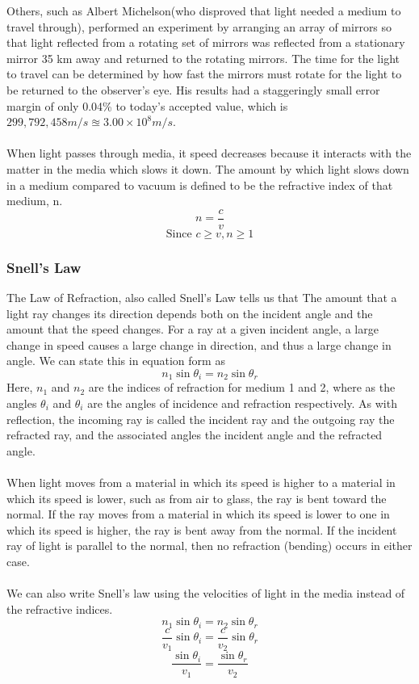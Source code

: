 \documentclass[11pt]{article}
\begin{document}
	Others, such as Albert Michelson(who disproved that light needed a medium to travel through), performed an experiment by arranging an array of mirrors so that light reflected from a rotating set of mirrors was reflected from a stationary mirror 35 km away and returned to the rotating mirrors. The time for the light to travel can be determined by how fast the mirrors must rotate for the light to be returned to the observer’s eye. His results had a staggeringly small error margin of only 0.04\% to today's accepted value, which is $299,792,458m/s\approxeq3.00\times10^8m/s$. \\ \\
	When light passes through media, it speed decreases because it interacts with the matter in the media which slows it down. The amount by which light slows down in a medium compared to vacuum is defined to be the refractive index of that medium, n.
	$$n=\dfrac{c}{v}$$
	$$\text{Since }c\ge v, n\ge1$$ 
	\subsubsection*{Snell's Law}
	The Law of Refraction, also called Snell's Law tells us that The amount that a light ray changes its direction depends both on the incident angle and the amount that the speed changes. For a ray at a given incident angle, a large change in speed causes a large change in direction, and thus a large change in angle. We can state this in equation form as
	$$n_{1} \sin \theta_{i} = n_{2} \sin \theta_{r}$$
	Here, $n_1$ and  $n_2$ are the indices of refraction for medium 1 and 2, where as the angles $\theta_i$ and $\theta_i$ are the angles of incidence and refraction respectively. As with reflection, the incoming ray is called the incident ray and the outgoing ray the refracted ray, and the associated angles the incident angle and the refracted angle. \\ \\
	When light moves from a material in which its speed is
	higher to a material in which its speed is lower, such as from air to glass, the ray is bent toward the normal. If the ray moves from a material in which its speed is lower to one in which its speed is higher, the ray is bent away from the normal. If the incident ray of light is parallel to the normal, then no refraction (bending) occurs in either case. \\ \\
	We can also write Snell's law using the velocities of light in the media instead of the refractive indices.
	$$n_{1} \sin \theta_{i} = n_{2} \sin \theta_{r}$$
	$$\dfrac{c}{v_{1}} \sin \theta_{i} = \dfrac{c}{v_2}\sin \theta_{r}$$
	$$\dfrac{\sin\theta_{i}}{v_1}=\dfrac{\sin\theta_{r}}{v_2}$$
\end{document}
